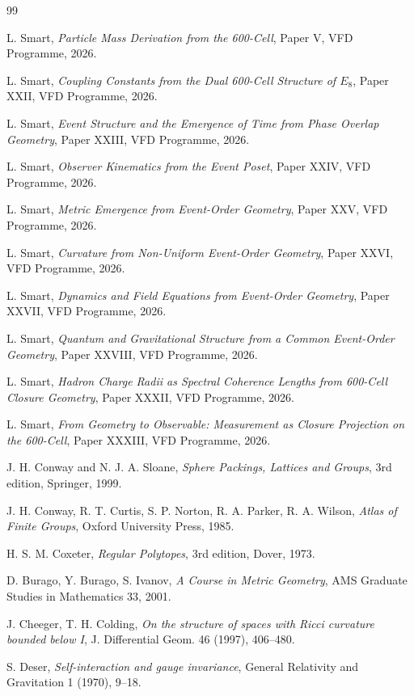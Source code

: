 \documentclass[12pt]{article}
\begin{document}

\begin{thebibliography}{99}

 L. Smart, \emph{Particle Mass Derivation from the 600-Cell}, Paper V, VFD Programme, 2026.

 L. Smart, \emph{Coupling Constants from the Dual 600-Cell Structure of $E_8$}, Paper XXII, VFD Programme, 2026.

 L. Smart, \emph{Event Structure and the Emergence of Time from Phase Overlap Geometry}, Paper XXIII, VFD Programme, 2026.

 L. Smart, \emph{Observer Kinematics from the Event Poset}, Paper XXIV, VFD Programme, 2026.

 L. Smart, \emph{Metric Emergence from Event-Order Geometry}, Paper XXV, VFD Programme, 2026.

 L. Smart, \emph{Curvature from Non-Uniform Event-Order Geometry}, Paper XXVI, VFD Programme, 2026.

 L. Smart, \emph{Dynamics and Field Equations from Event-Order Geometry}, Paper XXVII, VFD Programme, 2026.

 L. Smart, \emph{Quantum and Gravitational Structure from a Common Event-Order Geometry}, Paper XXVIII, VFD Programme, 2026.

 L. Smart, \emph{Hadron Charge Radii as Spectral Coherence Lengths from 600-Cell Closure Geometry}, Paper XXXII, VFD Programme, 2026.

 L. Smart, \emph{From Geometry to Observable: Measurement as Closure Projection on the 600-Cell}, Paper XXXIII, VFD Programme, 2026.

 J. H. Conway and N. J. A. Sloane, \emph{Sphere Packings, Lattices and Groups}, 3rd edition, Springer, 1999.

 J. H. Conway, R. T. Curtis, S. P. Norton, R. A. Parker, R. A. Wilson, \emph{Atlas of Finite Groups}, Oxford University Press, 1985.

 H. S. M. Coxeter, \emph{Regular Polytopes}, 3rd edition, Dover, 1973.

 D. Burago, Y. Burago, S. Ivanov, \emph{A Course in Metric Geometry}, AMS Graduate Studies in Mathematics 33, 2001.

 J. Cheeger, T. H. Colding, \emph{On the structure of spaces with Ricci curvature bounded below I}, J. Differential Geom. 46 (1997), 406--480.

 S. Deser, \emph{Self-interaction and gauge invariance}, General Relativity and Gravitation 1 (1970), 9--18.

\end{thebibliography}
\end{document}
